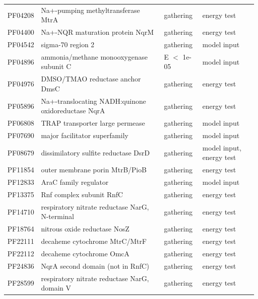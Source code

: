 \begin{longtable}{p{1.6cm}p{8.2cm}p{1.8cm}p{3cm}}
PF04208 & Na+-pumping methyltransferase MtrA & gathering & energy test \\
PF04400 & Na+-NQR maturation protein NqrM & gathering & energy test \\
PF04542 & sigma-70 region 2 & gathering & model input \\
PF04896 & ammonia/methane monooxygenase subunit C & E $<$ 1e-05 & model input \\
PF04976 & DMSO/TMAO reductase anchor DmsC & gathering & energy test \\
PF05896 & Na+-translocating NADH:quinone oxidoreductase NqrA & gathering & energy test \\
PF06808 & TRAP transporter large permease & gathering & model input \\
PF07690 & major facilitator superfamily & gathering & model input \\
PF08679 & dissimilatory sulfite reductase DsrD & gathering & model input, energy test \\
PF11854 & outer membrane porin MtrB/PioB & gathering & energy test \\
PF12833 & AraC family regulator & gathering & model input \\
PF13375 & Rnf complex subunit RnfC & gathering & energy test \\
PF14710 & respiratory nitrate reductase NarG, N-terminal & gathering & energy test \\
PF18764 & nitrous oxide reductase NosZ & gathering & energy test \\
PF22111 & decaheme cytochrome MtrC/MtrF & gathering & energy test \\
PF22112 & decaheme cytochrome OmcA & gathering & energy test \\
PF24836 & NqrA second domain (not in RnfC) & gathering & energy test \\
PF28599 & respiratory nitrate reductase NarG, domain V & gathering & energy test \\
\bottomrule
\end{longtable}
